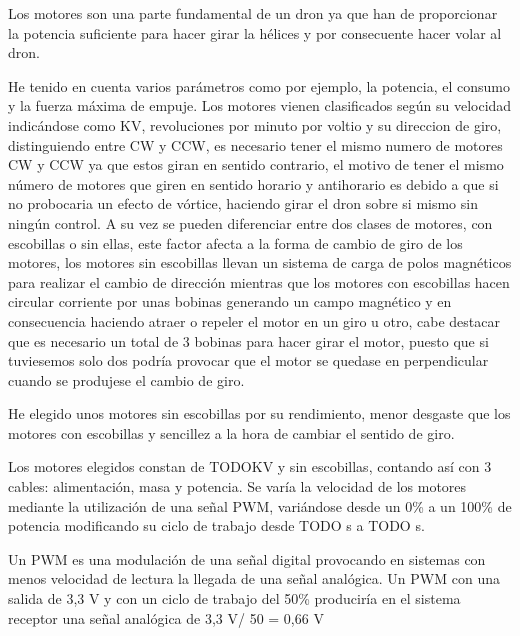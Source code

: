 
Los motores son una parte fundamental de un dron ya que han de proporcionar la potencia suficiente para hacer girar la hélices y por consecuente hacer volar al dron. 
                
 He tenido en cuenta varios parámetros como por ejemplo, la potencia, el consumo y la fuerza máxima de empuje. Los motores vienen clasificados según su velocidad indicándose como KV, revoluciones por minuto por voltio y su direccion de giro, distinguiendo entre CW y CCW, es necesario tener el mismo numero de motores CW y CCW ya que estos giran en sentido contrario, el motivo de tener el mismo número de motores que giren en sentido horario y antihorario es debido a que si no probocaria un efecto de vórtice, haciendo girar el dron sobre si mismo sin ningún control. A su vez se pueden diferenciar entre dos clases de motores, con escobillas o sin ellas, este factor afecta a la forma de cambio de giro de los motores, los motores sin escobillas llevan un sistema de carga de polos magnéticos para realizar el cambio de dirección mientras que los motores con escobillas hacen circular corriente por unas bobinas generando un campo magnético y en consecuencia haciendo atraer o repeler el motor en un giro u otro, cabe destacar que es necesario un total de 3 bobinas para hacer girar el motor, puesto que si tuviesemos solo dos podría provocar que el motor se quedase en perpendicular cuando se produjese el cambio de giro.
                
 He elegido unos motores sin escobillas por su rendimiento, menor desgaste que los motores con escobillas y sencillez a la hora de cambiar el sentido de giro. 
                
 Los motores elegidos constan de TODOKV y sin escobillas, contando así con 3 cables: alimentación, masa y potencia. Se varía la velocidad de los motores mediante la utilización de una señal PWM, variándose desde un 0\% a un 100\% de potencia modificando su ciclo de trabajo desde TODO s a TODO s.
 
 Un PWM es una modulación de una señal digital provocando en sistemas con menos velocidad de lectura la llegada de una señal analógica. Un PWM con una salida de 3,3 V y con un ciclo de trabajo del 50\% produciría en el sistema receptor una señal analógica de 3,3 V/ 50 = 0,66 V